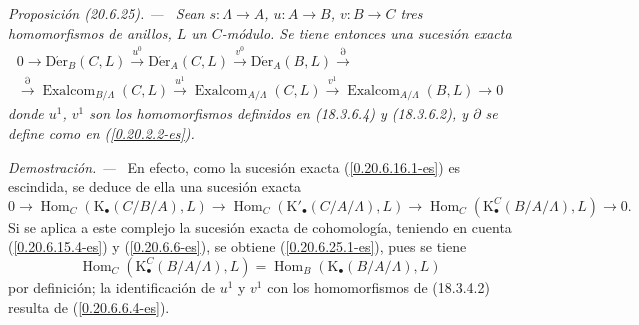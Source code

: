 \documentclass[10pt,oneside]{book}
\makeatletter
\newcommand{\sref}[1]{\textup{(\ref{#1})}}
\newcommand{\setmanualcurrentlabel}[1]{\def\@currentlabel{#1}}
\newenvironment{proposition}[1][]{%
  \setmanualcurrentlabel{#1}\par\medskip\noindent\itshape Proposición (#1). ---\ }{\par}
\newenvironment{proof}{%
  \par\medskip\noindent\textit{Demostración. ---\ }}{\par}
\makeatother
\begin{document}
\begin{proposition}[20.6.25]
\label{0.20.6.25-es}
Sean $s:\Lambda\to A$, $u:A\to B$, $v:B\to C$ tres homomorfismos
de anillos, $L$ un $C$-módulo. Se tiene entonces una sucesión exacta
\begin{equation}
\tag{20.6.25.1}
\label{0.20.6.25.1-es}
\begin{split}
  0\to\operatorname{D\acute{e}r}_B(C,L)\xrightarrow{u^0}
  \operatorname{D\acute{e}r}_A(C,L)\xrightarrow{v^0}
  \operatorname{D\acute{e}r}_A(B,L)\xrightarrow{\partial} \\
  \xrightarrow{\partial}\operatorname{Exalcom}_{B/\Lambda}(C,L)\xrightarrow{u^1}
  \operatorname{Exalcom}_{A/\Lambda}(C,L)\xrightarrow{v^1}
  \operatorname{Exalcom}_{A/\Lambda}(B,L)\to0
\end{split}
\end{equation}
donde $u^1$, $v^1$ son los homomorfismos definidos en \textup{(18.3.6.4)} y
\textup{(18.3.6.2)}, y $\partial$ se define como en \sref{0.20.2.2-es}.
\end{proposition}

\begin{proof}
En efecto, como la sucesión exacta \sref{0.20.6.16.1-es} es escindida, se
deduce de ella una sucesión exacta
\[
  0\to\operatorname{Hom}_C(\mathrm{K}_\bullet(C/B/A),L)\to
  \operatorname{Hom}_C(\mathrm{K}'_\bullet(C/A/\Lambda),L)\to
  \operatorname{Hom}_C(\mathrm{K}^C_\bullet(B/A/\Lambda),L)\to0.
\]
Si se aplica a este complejo la sucesión exacta de cohomología, teniendo en cuenta
\sref{0.20.6.15.4-es} y \sref{0.20.6.6-es}, se obtiene
\sref{0.20.6.25.1-es}, pues se tiene
\[
  \operatorname{Hom}_C(\mathrm{K}^C_\bullet(B/A/\Lambda),L)
  =\operatorname{Hom}_B(\mathrm{K}_\bullet(B/A/\Lambda),L)
\]
por definición; la identificación de $u^1$ y $v^1$ con los homomorfismos
de (18.3.4.2) resulta de \sref{0.20.6.6.4-es}.
\end{proof}
\end{document}

